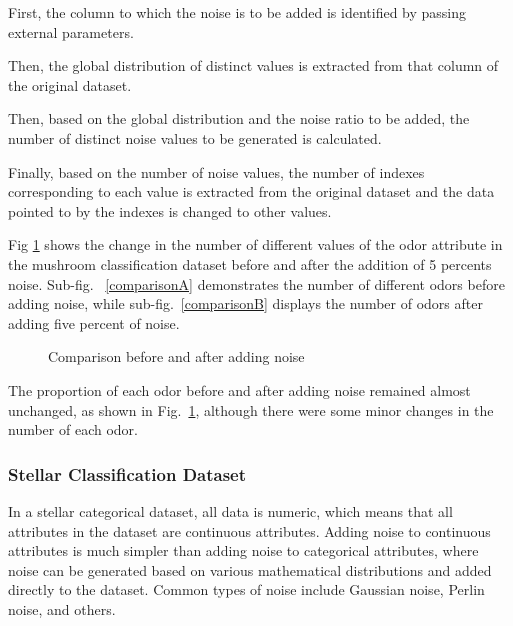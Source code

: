 \documentclass[runningheads,a4paper]{llncs}
\begin{document}
First, the column to which the noise is to be added is identified by passing external parameters.

Then, the global distribution of distinct values is extracted from that column of the original dataset.

Then, based on the global distribution and the noise ratio to be added, the number of distinct noise values to be generated is calculated.

Finally, based on the number of noise values, the number of indexes corresponding to each value is extracted from the original dataset and the data pointed to by the indexes is changed to other values.

Fig \ref{Comparison before and after adding noise} shows the change in the number of different values of the odor attribute in the mushroom classification dataset before and after the addition of 5 percents noise.
Sub-fig. ~\ref{comparisonA} demonstrates the number of different odors before adding noise, while sub-fig.~\ref{comparisonB} displays the number of odors after adding five percent of noise.
\begin{figure}[H]
    \centering

    \hfill


    \caption{Comparison before and after adding noise}
    \label{Comparison before and after adding noise}
\end{figure}

The proportion of each odor before and after adding noise remained almost unchanged, as shown in Fig.~\ref{Comparison before and after adding noise}, although there were some minor changes in the number of each odor.

\subsubsection{Stellar Classification Dataset}
In a stellar categorical dataset, all data is numeric, which means that all attributes in the dataset are continuous attributes. Adding noise to continuous attributes is much simpler than adding noise to categorical attributes, where noise can be generated based on various mathematical distributions and added directly to the dataset.
Common types of noise include Gaussian noise, Perlin noise, and others.
\end{document}
